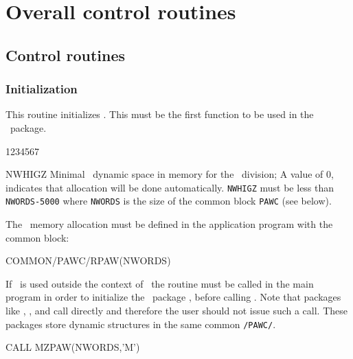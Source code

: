 \chapter{Overall control routines}

\section{Control routines}
 
\subsection{Initialization}
\Action
This routine initializes \HIGZ. This must be the first function to be used in
the \HIGZ~package.
\Pdesc
\begin{DLtt}{1234567}
\item[NWHIGZ] Minimal \ZEBRA~dynamic space in memory for the \HIGZ~division;
              A value of 0, indicates that allocation will be done
	      automatically. {\tt NWHIGZ} must be less than {\tt NWORDS-5000}
              where {\tt NWORDS} is the size of the common block {\tt PAWC}
              (see below).
\end{DLtt}
The \ZEBRA~memory allocation must be defined in the application program with
the common block:
\begin{XMP}
      COMMON/PAWC/RPAW(NWORDS)
\end{XMP}
If \HIGZ~is used outside the context of \PAW~the routine  must be
called in the main program in order to initialize the \ZEBRA~package
\cite{bib-ZEBRA}, before calling . Note that packages like
\HBOOK\cite{bib-HBOOK}, \HPLOT\cite{bib-HPLOT}, \PAW\cite{bib-PAW} and
\KUIP\cite{bib-KUIP} call  directly and therefore the user should
not issue such a call. These packages store dynamic structures in the same
common {\tt/PAWC/}.
\begin{XMP}
      CALL MZPAW(NWORDS,'M')
\end{XMP}
 
